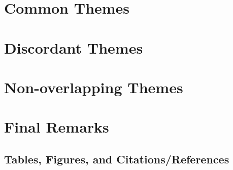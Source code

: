 \documentclass{sig-alternate}
\begin{document}
\section{Common Themes}
\label{common themes}

\section{Discordant Themes}
\label{discordant themes}

\section{Non-overlapping Themes}
\label{non-overlapping themes}

\section{Final Remarks}
\label{final remarks}

\subsection{Tables, Figures, and Citations/References}



\balance
\end{document}
